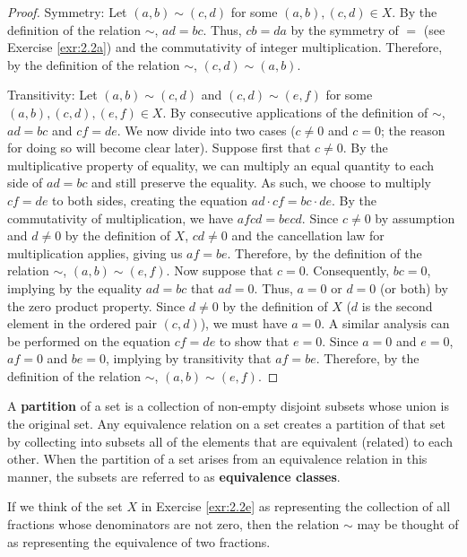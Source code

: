 \documentclass[../main.tex]{subfiles}
\begin{document}
\begin{exercise}
\begin{enumerate}[label={\alph*)},ref={\theexercise\alph*}]
\begin{proof}
            Symmetry: Let $(a,b)\sim(c,d)$ for some $(a,b),(c,d)\in X$. By the definition of the relation $\sim$, $ad=bc$. Thus, $cb=da$ by the symmetry of $=$ (see Exercise \ref{exr:2.2a}) and the commutativity of integer multiplication. Therefore, by the definition of the relation $\sim$, $(c,d)\sim(a,b)$.\par
            Transitivity: Let $(a,b)\sim(c,d)$ and $(c,d)\sim(e,f)$ for some $(a,b),(c,d),(e,f)\in X$. By consecutive applications of the definition of $\sim$, $ad=bc$ and $cf=de$. We now divide into two cases ($c\neq 0$ and $c=0$; the reason for doing so will become clear later). Suppose first that $c\neq 0$. By the multiplicative property of equality, we can multiply an equal quantity to each side of $ad=bc$ and still preserve the equality. As such, we choose to multiply $cf=de$ to both sides, creating the equation $ad\cdot cf=bc\cdot de$. By the commutativity of multiplication, we have $afcd=becd$. Since $c\neq 0$ by assumption and $d\neq 0$ by the definition of $X$, $cd\neq 0$ and the cancellation law for multiplication applies, giving us $af=be$. Therefore, by the definition of the relation $\sim$, $(a,b)\sim(e,f)$. Now suppose that $c=0$. Consequently, $bc=0$, implying by the equality $ad=bc$ that $ad=0$. Thus, $a=0$ or $d=0$ (or both) by the zero product property. Since $d\neq 0$ by the definition of $X$ ($d$ is the second element in the ordered pair $(c,d)$), we must have $a=0$. A similar analysis can be performed on the equation $cf=de$ to show that $e=0$. Since $a=0$ and $e=0$, $af=0$ and $be=0$, implying by transitivity that $af=be$. Therefore, by the definition of the relation $\sim$, $(a,b)\sim(e,f)$.
        \end{proof}
    \end{enumerate}
\end{exercise}

\begin{remark}\label{rmk:2.3}
    A \textbf{partition} of a set is a collection of non-empty disjoint subsets whose union is the original set. Any equivalence relation on a set creates a partition of that set by collecting into subsets all of the elements that are equivalent (related) to each other. When the partition of a set arises from an equivalence relation in this manner, the subsets are referred to as \textbf{equivalence classes}.
\end{remark}

\begin{remark}\label{rmk:2.4}
    If we think of the set $X$ in Exercise \ref{exr:2.2e} as representing the collection of all fractions whose denominators are not zero, then the relation $\sim$ may be thought of as representing the equivalence of two fractions.
\end{remark}
\end{document}
